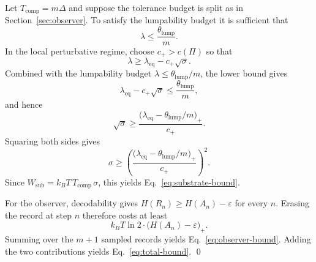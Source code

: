 \documentclass[11pt,a4paper]{article}
\theoremstyle{definition}
\theoremstyle{remark}
\newcommand{\Tc}{T_{\mathrm{comp}}}
\newcommand{\Eqref}[1]{Eq.~\eqref{#1}}
\begin{document}
\begin{appendices}
Let $\Tc=m\Delta$ and suppose the tolerance budget is split as in Section~\ref{sec:observer}. To satisfy the lumpability budget it is sufficient that
\[
\lambda \leq \frac{\theta_{\mathrm{lump}}}{m}.
\]
In the local perturbative regime, choose $c_+>c(\Pi)$ so that
\[
\lambda \geq \lambda_{\mathrm{eq}} - c_+\sqrt{\sigma}.
\]
Combined with the lumpability budget $\lambda \leq \theta_{\mathrm{lump}}/m$, the lower bound gives
\[
\lambda_{\mathrm{eq}} - c_+\sqrt{\sigma}
\leq
\frac{\theta_{\mathrm{lump}}}{m},
\]
and hence
\[
\sqrt{\sigma}
\geq
\frac{\bigl(\lambda_{\mathrm{eq}}-\theta_{\mathrm{lump}}/m\bigr)_+}{c_+}.
\]
Squaring both sides gives
\[
\sigma
\geq
\left(
\frac{\bigl(\lambda_{\mathrm{eq}}-\theta_{\mathrm{lump}}/m\bigr)_+}{c_+}
\right)^2.
\]
Since $W_{\mathrm{sub}} = k_BT\,\Tc\,\sigma$, this yields \Eqref{eq:substrate-bound}.

For the observer, decodability gives $H(R_n)\geq H(A_n)-\varepsilon$ for every $n$. Erasing the record at step $n$ therefore costs at least
\[
k_BT\ln 2 \cdot \bigl(H(A_n)-\varepsilon\bigr)_+.
\]
Summing over the $m+1$ sampled records yields \Eqref{eq:observer-bound}. Adding the two contributions yields \Eqref{eq:total-bound}. \qed

\end{appendices}
\end{document}
